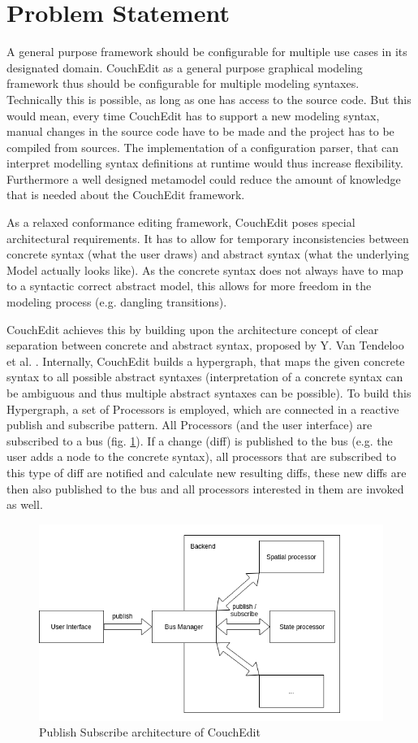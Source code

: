 \section{Problem Statement}
\label{sec:problem_statement}

A general purpose framework should be configurable for multiple use cases in its designated domain. CouchEdit as a general purpose graphical modeling framework thus should be configurable for multiple modeling syntaxes. Technically this is possible, as long as one has access to the source code. But this would mean, every time CouchEdit has to support a new modeling syntax, manual changes in the source code have to be made and the project has to be compiled from sources. The implementation of a configuration parser, that can interpret modelling syntax definitions at runtime would thus increase flexibility. Furthermore a well designed metamodel could reduce the amount of knowledge that is needed about the CouchEdit framework.

As a relaxed conformance editing framework, CouchEdit poses special architectural requirements. It has to allow for temporary inconsistencies between concrete syntax (what the user draws) and abstract syntax (what the underlying Model actually looks like). As the concrete syntax does not always have to map to a syntactic correct abstract model, this allows for more freedom in the modeling process (e.g. dangling transitions).

CouchEdit achieves this by building upon the architecture concept of clear separation between concrete and abstract syntax, proposed by Y. Van Tendeloo et al. \cite{van_tendeloo_concrete_2017}. Internally, CouchEdit builds a hypergraph, that maps the given concrete syntax to all possible abstract syntaxes (interpretation of a concrete syntax can be ambiguous and thus multiple abstract syntaxes can be possible). To build this Hypergraph, a set of Processors is employed, which are connected in a reactive publish and subscribe pattern. All Processors (and the user interface) are subscribed to a bus (fig. \ref{fig:processors}). If a change (diff) is published to the bus (e.g. the user adds a node to the concrete syntax), all processors that are subscribed to this type of diff are notified and calculate new resulting diffs, these new diffs are then also published to the bus and all processors interested in them are invoked as well.

\begin{figure}
  \centering
  \includegraphics[width=.6\linewidth]{images/couchedit-processors}
  \caption{Publish Subscribe architecture of CouchEdit}
  \label{fig:processors}
\end{figure}

